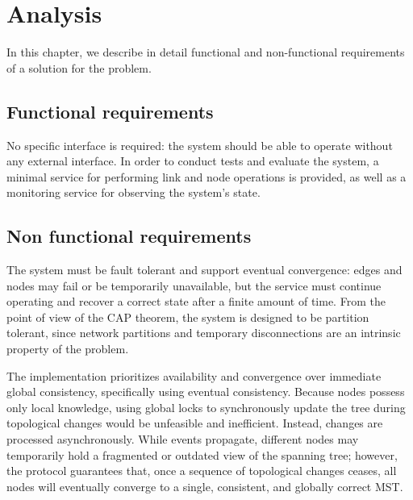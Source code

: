 \chapter{Analysis}\label{ch:analysis}

In this chapter, we describe in detail functional and non-functional requirements of a solution for the problem.

\section{Functional requirements}
No specific interface is required: the system should be able to operate without any external interface. In order to conduct tests and evaluate the system, a minimal service for performing link and node operations is provided, as well as a monitoring service for observing the system's state.


\section{Non functional requirements}



The system must be fault tolerant and support eventual convergence: edges and nodes may fail or be temporarily unavailable, but the service must continue operating and recover a correct state after a finite amount of time. From the point of view of the CAP theorem, the system is designed to be partition tolerant, since network partitions and temporary disconnections are an intrinsic property of the problem.

The implementation prioritizes availability and convergence over immediate global consistency, specifically using eventual consistency. Because nodes possess only local knowledge, using global locks to synchronously update the tree during topological changes would be unfeasible and inefficient. Instead, changes are processed asynchronously. While events propagate, different nodes may temporarily hold a fragmented or outdated view of the spanning tree; however, the protocol guarantees that, once a sequence of topological changes ceases, all nodes will eventually converge to a single, consistent, and globally correct MST.


